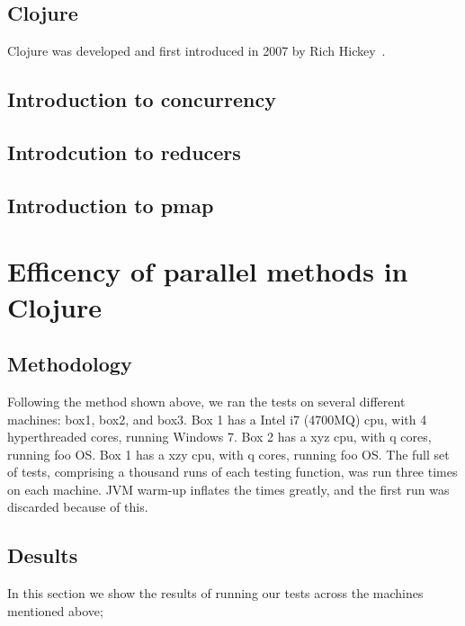 \documentclass[12pt]{article}
\newcommand{\comment}[1]{{\bf \tt  {#1}}}
\newcommand{\emcomment}[1]{\textcolor{ForestGreen}{\comment{Elena: {#1}}}}
\begin{document}
\subsection{Clojure}\label{sec:clojure}
Clojure was developed and first introduced in 2007 by Rich Hickey~\cite{Hickey:2008}. 

\subsection{Introduction to concurrency}\label{sec:concurrency}

\subsection{Introdcution to reducers}\label{sec:reducers}

\subsection{Introduction to pmap}\label{sec:pmap}

\section{Efficency of parallel methods in Clojure}\label{sec:efficency}

\subsection{Methodology}\label{sec:methods}
\newcommand{\emcomment}[1]{\textcolor{Teal}{\comment{Henry: {we'll need an explaination of the tests - I'm running compare-sum-primes, and I'm thinking about the others. The following is just a sketch}}}}
Following the method shown above, we ran the tests on several different machines: box1, box2, and box3. Box 1 has a Intel i7 (4700MQ) cpu, with 4 hyperthreaded cores, running Windows 7. Box 2 has a xyz cpu, with q cores, running foo OS. Box 1 has a xzy cpu, with q cores, running foo OS. The full set of tests, comprising a thousand runs of each testing function, was run three times on each machine. JVM warm-up inflates the times greatly, and the first run was discarded because of this.

\subsection{Desults}\label{sec:results}
In this section we show the results of running our tests across the machines mentioned above;
\newcommand{\emcomment}[1]{\textcolor{Teal}{\comment{Henry: {I'll be putting the carts & tables here}}}}
\end{document}
